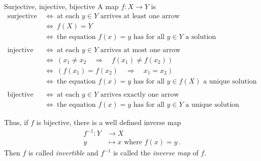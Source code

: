 \begin{Faust}{Surjective{,} injective{,} bijective}
A map  $f: X \rightarrow Y$ is
\begin{align*}
\text{surjective}\ &\Leftrightarrow\ \text{at each } y\in Y \text{ arrives at least one arrow} \\
&\Leftrightarrow\ f(X)=Y\\
&\Leftrightarrow\ \text{the equation } f(x)=y \text{ has for all } y\in Y \text{ a solution} \\
\\
\text{injective}\ &\Leftrightarrow\ \text{at each } y\in Y \text{ arrives at most one arrow}\\
&\Leftrightarrow\ \left( x_1 \neq x_2\quad \Rightarrow\quad f(x_1)\neq f(x_2) \right) \\
&\Leftrightarrow\ \left( f(x_1)=f(x_2)\quad \Rightarrow\quad x_1=x_2 \right) \\
&\Leftrightarrow\ \text{the equation } f(x)=y \text{ has for all } y\in f(X)  \text{ a unique solution} \\
\\
\text{bijective}\ &\Leftrightarrow\ \text{at each } y\in Y \text{ arrives exactly one arrow} \\
&\Leftrightarrow\ \text{the equation } f(x)=y \text{ has for all } y\in Y \text{ a unique solution}
\end{align*}
\end{Faust}


Thus, if $f$ is bijective, there is a well defined inverse map 
\begin{align*}
f^{-1}:Y&\to X\\
       y &\mapsto x \text{ where } f(x)=y \,.
\end{align*}
Then $f$ is called \emph{invertible}
and $f^{-1}$ is called the \emph{inverse map} of $f$.

